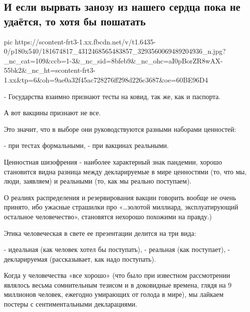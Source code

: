  
 
 
 
 
\subsection{И если вырвать занозу из нашего сердца пока не удаётся, то хотя бы пошатать}
\label{sec:09_05_2021.fb.arestovich_aleksej.1.ukraina_cennosti_zhertvy}

\ifcmt
  pic https://scontent-frt3-1.xx.fbcdn.net/v/t1.6435-0/p180x540/181674817_4312468565483857_3293560069489204936_n.jpg?_nc_cat=109&ccb=1-3&_nc_sid=8bfeb9&_nc_ohc=aI0pBorZR8wAX-55bk2&_nc_ht=scontent-frt3-1.xx&tp=6&oh=9ae0a32f45ac728276ff298d226c3687&oe=60BE96D4
\fi

- Государства взаимно признают тесты на ковид,  так же, как и паспорта.

А вот вакцины признают не все.

Это значит, что в выборе они руководствуются разными наборами ценностей:

- при тестах формальными,
- при вакцинах реальными.

Ценностная шизофрения - наиболее характерный знак пандемии, хорошо становится
видна разница между декларируемые в мире ценностями (то, что мы, люди,
заявляем) и реальными (то, как мы реально поступаем). 

О реалиях распределения и резервирования вакцин говорить вообще не очень
принято, ибо ужасные страшилки про «…золотой миллиард, эксплуатирующий
остальное человечество», становятся нехорошо похожими на правду.)

Этика человеческая в свете ее презентации делится на три вида:

- идеальная (как человек хотел бы поступать),
- реальная (как поступает),
- декларируемая (рассказывает, как надо поступать).

Когда у человечества «все хорошо» (что было при известном рассмотрении являлось
весьма сомнительным тезисом и в доковидные времена, глядя на 9 миллионов
человек, ежегодно умирающих от голода в мире), мы лайкаем постеры с
сентиментальными декларациями.


